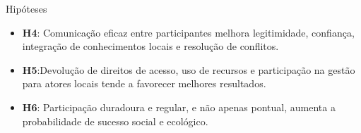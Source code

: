 \begin{frame}{Hipóteses}
\begin{itemize}
    \item \textbf{H4}: Comunicação eficaz entre participantes melhora legitimidade, confiança, integração de conhecimentos locais e resolução de conflitos.
    \item \textbf{H5}:Devolução de direitos de acesso, uso de recursos e participação na gestão para atores locais tende a favorecer melhores resultados.
    \item \textbf{H6}: Participação duradoura e regular, e não apenas pontual, aumenta a probabilidade de sucesso social e ecológico.
\end{itemize}
\end{frame}